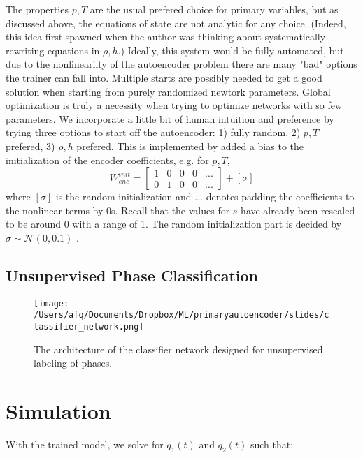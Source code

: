 \documentclass[]{article}
\begin{document}
The properties \(p,T\) are the usual prefered choice for primary
variables, but as discussed above, the equations of state are not
analytic for any choice. (Indeed, this idea first spawned when the
author was thinking about systematically rewriting equations in
\(\rho,h\).) Ideally, this system would be fully automated, but due to
the nonlinearilty of the autoencoder problem there are many "bad"
options the trainer can fall into. Multiple starts are possibly needed
to get a good solution when starting from purely randomized newtork
parameters. Global optimization is truly a necessity when trying to
optimize networks with so few parameters. We incorporate a little bit of
human intuition and preference by trying three options to start off the
autoencoder: 1) fully random, 2) \(p,T\) prefered, 3) \(\rho,h\)
prefered. This is implemented by added a bias to the initialization of
the encoder coefficients, e.g. for \(p,T\),
\begin{equation}
 W^{init}_{enc} = \left[\begin{array}{ccccc}
1 & 0 & 0 & 0 & ... \\
0 & 1 & 0 & 0 & ...
                        \end{array}\right]+[\sigma]
\end{equation}
where \([\sigma]\) is the random initialization and \(…\) denotes
padding the coefficients to the nonlinear terms by 0s. Recall that the
values for \(s\) have already been rescaled to be around 0 with a range
of 1. The random initialization part is decided by
\(\sigma \sim \mathcal{N}(0,0.1)\) .

\hypertarget{header-n3317}{%
\subsection{Unsupervised Phase Classification}\label{header-n3317}}

\begin{figure}
\centering
\texttt{[image: /Users/afq/Documents/Dropbox/ML/primaryautoencoder/slides/classifier\_network.png]}
\caption{The architecture of the classifier network designed for
  unsupervised labeling of phases.}
\end{figure}

\hypertarget{header-n3321}{%
\section{Simulation}\label{header-n3321}}

With the trained model, we solve for \(q_1(t)\) and \(q_2(t)\) such that:
\end{document}
